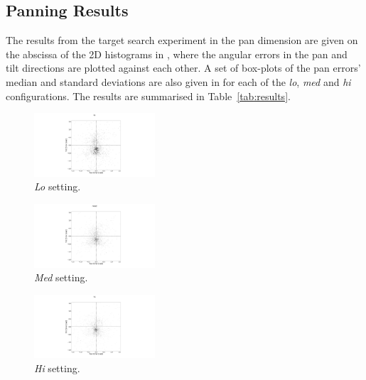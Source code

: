 \documentclass[sigconf, review=true, screen=true, anonymous=true]{acmart}
\begin{document}

\subsection{Panning Results}

The results from the target search experiment in the pan dimension are given on the abscissa of the 2D histograms in , where the angular errors in the pan and tilt directions are plotted against each other.
A set of box-plots of the pan errors' median and standard deviations are also given in  for each of the \emph{lo}, \emph{med} and \emph{hi} configurations.
The results are summarised in Table~\ref{tab:results}.

\begin{figure}
  \centering
  \includegraphics[clip, trim=450 0 450 110, width=0.4\textwidth]{figures/err_lo.png}
  \caption{\emph{Lo} setting. }
  \label{fig:err-results-lo}
\end{figure}
\begin{figure}
  \centering
  \includegraphics[clip, trim=450 0 450 110, width=0.4\textwidth]{figures/err_med.png}
  \caption{\emph{Med} setting. }
  \label{fig:err-results-med}
\end{figure}

\begin{figure}
  \centering
  \includegraphics[clip, trim=450 0 450 60, width=0.4\textwidth]{figures/err_hi.png}
  \caption{\emph{Hi} setting. }
  \label{fig:err-results-hi}
\end{figure}
\end{document}
